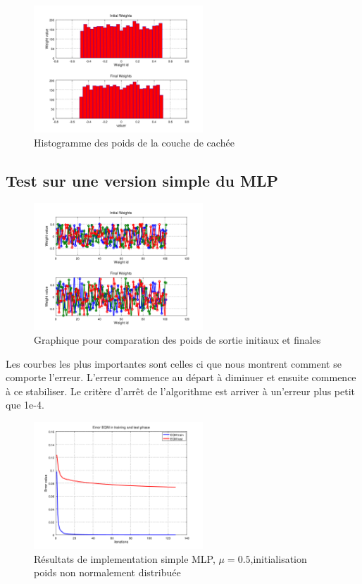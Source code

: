 \documentclass[journal]{IEEEtran}
\begin{document}
\begin{figure}[h]
	\centering
	\includegraphics[width=2.5in]{../OctaveNeurons/rs4}
	\caption{Histogramme des poids de la couche de cachée}
	\label{fig:histoC}
\end{figure}

\subsection{Test sur une version simple du MLP}

\begin{figure}[h]
	\centering
	\includegraphics[width=2.5in]{../OctaveNeurons/rs2}
	\caption{Graphique pour comparation des poids de sortie initiaux et finales}
	\label{fig:SignauxNormalises}
\end{figure}

Les courbes les plus importantes sont celles ci que nous montrent comment se comporte
l'erreur. L'erreur commence au départ à diminuer et ensuite commence à ce stabiliser.
Le critère d'arrêt de l'algorithme est arriver à un'erreur plus petit que 1e-4.
\begin{figure}[h]
	\centering
	\includegraphics[width=2.5in]{../OctaveNeurons/rs1}
	\caption{Résultats de implementation simple MLP, $\mu=0.5$,initialisation poids non normalement distribuée}
	\label{fig:CourbeError}
\end{figure}
\end{document}
